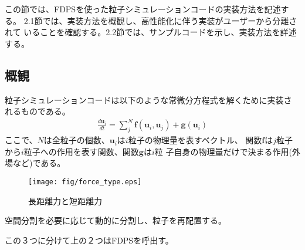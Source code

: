 \documentclass[12pt,a4paper]{jarticle}
\begin{document}
この節では、FDPSを使った粒子シミュレーションコードの実装方法を記述する。
2.1節では、実装方法を概観し、高性能化に伴う実装がユーザーから分離されて
いることを確認する。2.2節では、サンプルコードを示し、実装方法を詳述する。

\subsection{概観}

粒子シミュレーションコードは以下のような常微分方程式を解くために実装さ
れるものである。
\begin{align}
  \frac{d\bm{u}_i}{dt} = \sum_{j}^N \bm{f}(\bm{u}_i,\bm{u}_j) +
  \bm{g}(\bm{u}_i) \label{eq:geq}
\end{align}
ここで、$N$は全粒子の個数、$\bm{u}_i$は$i$粒子の物理量を表すベクトル、
関数$\bm{f}$は$j$粒子から$i$粒子への作用を表す関数、関数$\bm{g}$は$i$粒
子自身の物理量だけで決まる作用(外場など)である。

\begin{figure}
  \begin{center}
    \texttt{[image: fig/force\_type.eps]}
  \end{center}
  \caption{長距離力と短距離力}
  \label{fig:force_type}
\end{figure}

空間分割を必要に応じて動的に分割し、粒子を再配置する。

この３つに分けて上の２つはFDPSを呼出す。
\end{document}
